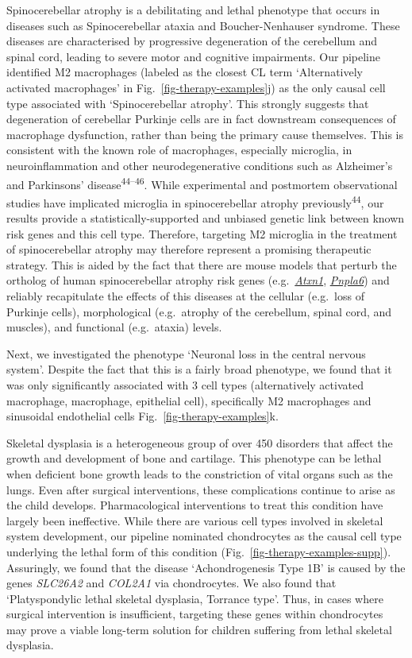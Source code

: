 \documentclass[
]{article}
\begin{document}
Spinocerebellar atrophy is a debilitating and lethal phenotype that
occurs in diseases such as Spinocerebellar ataxia and Boucher-Nenhauser
syndrome. These diseases are characterised by progressive degeneration
of the cerebellum and spinal cord, leading to severe motor and cognitive
impairments. Our pipeline identified M2 macrophages (labeled as the
closest CL term `Alternatively activated macrophages' in
Fig.~\ref{fig-therapy-examples}j) as the only causal cell type
associated with `Spinocerebellar atrophy'. This strongly suggests that
degeneration of cerebellar Purkinje cells are in fact downstream
consequences of macrophage dysfunction, rather than being the primary
cause themselves. This is consistent with the known role of macrophages,
especially microglia, in neuroinflammation and other neurodegenerative
conditions such as Alzheimer's and Parkinsons'
disease\textsuperscript{44--46}. While experimental and postmortem
observational studies have implicated microglia in spinocerebellar
atrophy previously\textsuperscript{44}, our results provide a
statistically-supported and unbiased genetic link between known risk
genes and this cell type. Therefore, targeting M2 microglia in the
treatment of spinocerebellar atrophy may therefore represent a promising
therapeutic strategy. This is aided by the fact that there are mouse
models that perturb the ortholog of human spinocerebellar atrophy risk
genes
(e.g.~\href{https://www.informatics.jax.org/marker/MGI:104783}{\emph{Atxn1}},
\href{https://www.informatics.jax.org/marker/MGI:1354723}{\emph{Pnpla6}})
and reliably recapitulate the effects of this diseases at the cellular
(e.g.~loss of Purkinje cells), morphological (e.g.~atrophy of the
cerebellum, spinal cord, and muscles), and functional (e.g.~ataxia)
levels.

Next, we investigated the phenotype `Neuronal loss in the central
nervous system'. Despite the fact that this is a fairly broad phenotype,
we found that it was only significantly associated with 3 cell types
(alternatively activated macrophage, macrophage, epithelial cell),
specifically M2 macrophages and sinusoidal endothelial cells
Fig.~\ref{fig-therapy-examples}k.

Skeletal dysplasia is a heterogeneous group of over 450 disorders that
affect the growth and development of bone and cartilage. This phenotype
can be lethal when deficient bone growth leads to the constriction of
vital organs such as the lungs. Even after surgical interventions, these
complications continue to arise as the child develops. Pharmacological
interventions to treat this condition have largely been ineffective.
While there are various cell types involved in skeletal system
development, our pipeline nominated chondrocytes as the causal cell type
underlying the lethal form of this condition
(Fig.~\ref{fig-therapy-examples-supp}). Assuringly, we found that the
disease `Achondrogenesis Type 1B' is caused by the genes \emph{SLC26A2}
and \emph{COL2A1} via chondrocytes. We also found that `Platyspondylic
lethal skeletal dysplasia, Torrance type'. Thus, in cases where surgical
intervention is insufficient, targeting these genes within chondrocytes
may prove a viable long-term solution for children suffering from lethal
skeletal dysplasia.
\end{document}
